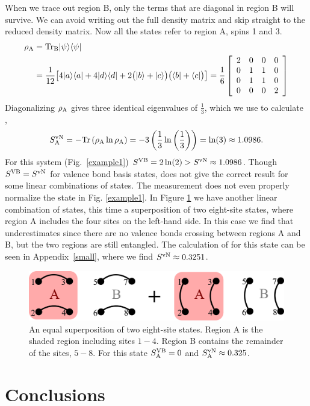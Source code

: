  When we trace out region B, only the terms that are diagonal in region B will survive. 
  We can avoid writing out the full density matrix and skip straight to the reduced density matrix.
  Now all the states refer to region A, spins 1 and 3.
  \begin{align}
\rho_{\rm A} &=  {\rm Tr_B} \lvert {\psi} \rangle\langle {\psi} \rvert \\ 
		&= \frac{1}{12} \big[ 
		4\lvert {a} \rangle \langle {a} \rvert + 4 \lvert {d} \rangle\langle {d} \rvert
		+ 2\big(\lvert {b} \rangle +\lvert {c} \rangle\big)\big(\langle {b} \rvert +\langle {c} \rvert\big)
		\big] =
		\frac{1}{6}
		\left[ \begin{array}{cccc}
		2 & 0&0&0\\
		0& 1& 1&0\\
		0& 1& 1&0\\
		0& 0& 0&2
		\end{array} \right]
 \end{align}
Diagonalizing $\rho_{\rm A}$ gives three identical eigenvalues of $\tfrac{1}{3}$, which we use to calculate \vN,
\begin{align}
S^{\text{vN}}_{\rm A} = - {\rm Tr} \left(\rho_{\rm A} \ln \rho_{\rm A} \right)= -3\left( \frac{1}{3} \ln \left( \frac{1}{3}\right)\right)
		= \ln(3) \approx 1.0986.
\end{align}
For this system (Fig.~\ref{example1}) $S^{\text{VB}} =2\ln(2) > S^{\text{vN}} \approx 1.0986$.
Though $S^{\text{VB}}=S^{\text{vN}}$ for valence bond basis states, \vb does not give the correct result for some linear combinations of states.  
The \vb measurement does not even properly normalize the state in Fig. \ref{example1}.
In Figure \ref{example2} we have another linear combination of states, this time a superposition of two eight-site states, where region A includes the four sites on the left-hand side.  In this case we find that \vb underestimates \vn since there are no valence bonds crossing between regions A and B, but the two regions are still entangled.  The calculation of \vn for this state can be seen in Appendix~\ref{small}, where we find $S^{\text{vN}}\approx 0.3251$.


\begin{figure}
\centering 
\includegraphics[width=6in]{./figures/made/example2.pdf}
\caption[A superposition of two eight-site valence bond states]{An equal superposition of two eight-site states.
Region A is the shaded region including sites $1-4$.  
Region B contains the remainder of the sites, $5-8$.
For this state $S^{\text{VB}}_{\rm A}=0$ and $S^{\text{vN}}_{\rm A}\approx 0.325$.
\label{example2}
}
\end{figure}













\section{Conclusions}
